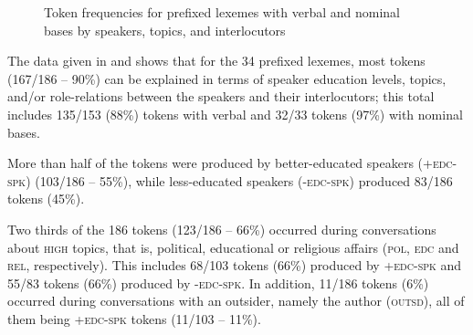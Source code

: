 \begin{figure}
\centering
\caption[Token frequencies for {pe(n)-}prefixed lexemes with verbal and nominal bases by speakers, topics, and interlocutors]{Token frequencies for prefixed lexemes with verbal and nominal bases by speakers, topics, and interlocutors}\label{Figure_3.3}
\end{figure}


The data given in  and  shows that for the 34 prefixed lexemes, most tokens (167/186 – 90\%) can be explained in terms of speaker education levels, topics, and/or role-relations between the speakers and their interlocutors; this total includes 135/153 (88\%) tokens with verbal and 32/33 tokens (97\%) with nominal bases.


More than half of the tokens were produced by better-educated speakers (\textsc{+edc-spk}) (103/186 – 55\%), while less-educated speakers (\textsc{-edc-spk}) produced 83/186 tokens (45\%).



Two thirds of the 186 tokens (123/186 – 66\%) occurred during conversations about \textsc{high} topics, that is, political, educational or religious affairs (\textsc{pol}, \textsc{edc} and \textsc{rel}, respectively). This includes 68/103 tokens (66\%) produced by \textsc{+edc-spk} and 55/83 tokens (66\%) produced by \textsc{-edc-spk}. In addition, 11/186 tokens (6\%) occurred during conversations with an outsider, namely the author (\textsc{outsd}), all of them being \textsc{+edc-spk} tokens (11/103 – 11\%).



